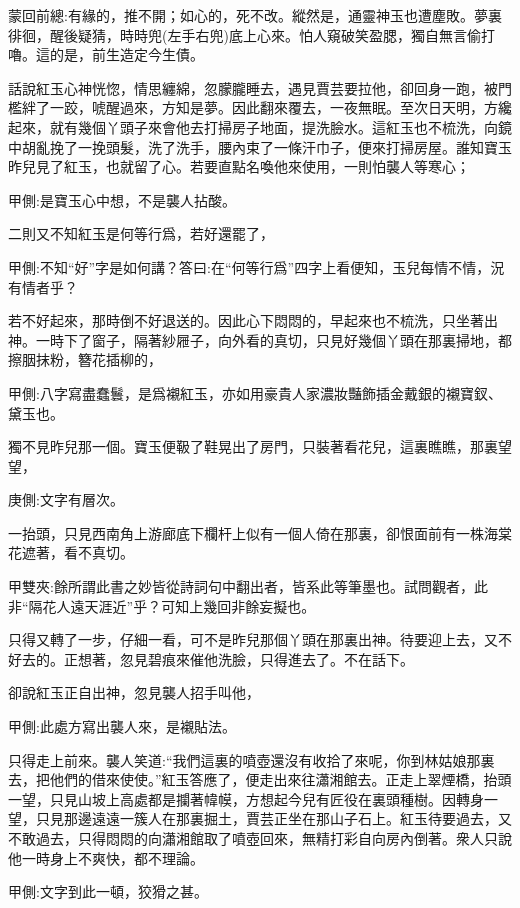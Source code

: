 

\begin{parag}
    \begin{note}蒙回前總:有緣的，推不開；如心的，死不改。縱然是，通靈神玉也遭塵敗。夢裏徘徊，醒後疑猜，時時兜(左手右兜)底上心來。怕人窺破笑盈腮，獨自無言偷打嚕。這的是，前生造定今生債。\end{note}
\end{parag}


\begin{parag}
    話說紅玉心神恍惚，情思纏綿，忽朦朧睡去，遇見賈芸要拉他，卻回身一跑，被門檻絆了一跤，唬醒過來，方知是夢。因此翻來覆去，一夜無眠。至次日天明，方纔起來，就有幾個丫頭子來會他去打掃房子地面，提洗臉水。這紅玉也不梳洗，向鏡中胡亂挽了一挽頭髮，洗了洗手，腰內束了一條汗巾子，便來打掃房屋。誰知寶玉昨兒見了紅玉，也就留了心。若要直點名喚他來使用，一則怕襲人等寒心；\begin{note}甲側:是寶玉心中想，不是襲人拈酸。\end{note}二則又不知紅玉是何等行爲，若好還罷了，\begin{note}甲側:不知“好”字是如何講？答曰:在“何等行爲”四字上看便知，玉兒每情不情，況有情者乎？\end{note}若不好起來，那時倒不好退送的。因此心下悶悶的，早起來也不梳洗，只坐著出神。一時下了窗子，隔著紗屜子，向外看的真切，只見好幾個丫頭在那裏掃地，都擦胭抹粉，簪花插柳的，\begin{note}甲側:八字寫盡蠢鬟，是爲襯紅玉，亦如用豪貴人家濃妝豔飾插金戴銀的襯寶釵、黛玉也。\end{note}獨不見昨兒那一個。寶玉便靸了鞋晃出了房門，只裝著看花兒，這裏瞧瞧，那裏望望，\begin{note}庚側:文字有層次。\end{note}一抬頭，只見西南角上游廊底下欄杆上似有一個人倚在那裏，卻恨面前有一株海棠花遮著，看不真切。\begin{note}甲雙夾:餘所謂此書之妙皆從詩詞句中翻出者，皆系此等筆墨也。試問觀者，此非“隔花人遠天涯近”乎？可知上幾回非餘妄擬也。\end{note}只得又轉了一步，仔細一看，可不是昨兒那個丫頭在那裏出神。待要迎上去，又不好去的。正想著，忽見碧痕來催他洗臉，只得進去了。不在話下。
\end{parag}


\begin{parag}
    卻說紅玉正自出神，忽見襲人招手叫他，\begin{note}甲側:此處方寫出襲人來，是襯貼法。\end{note}只得走上前來。襲人笑道:“我們這裏的噴壺還沒有收拾了來呢，你到林姑娘那裏去，把他們的借來使使。”紅玉答應了，便走出來往瀟湘館去。正走上翠煙橋，抬頭一望，只見山坡上高處都是攔著幃幙，方想起今兒有匠役在裏頭種樹。因轉身一望，只見那邊遠遠一簇人在那裏掘土，賈芸正坐在那山子石上。紅玉待要過去，又不敢過去，只得悶悶的向瀟湘館取了噴壺回來，無精打彩自向房內倒著。衆人只說他一時身上不爽快，都不理論。\begin{note}甲側:文字到此一頓，狡猾之甚。\end{note}
\end{parag}



